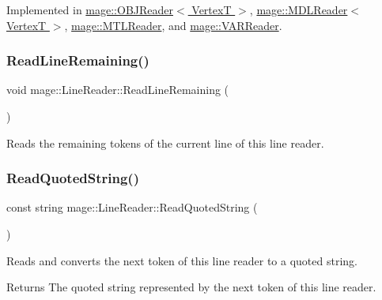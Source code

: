 Implemented in \hyperlink{classmage_1_1_o_b_j_reader_a8d4bd7be6de3098ba899cc36e3be1283}{mage\+::\+O\+B\+J\+Reader$<$ Vertex\+T $>$}, \hyperlink{classmage_1_1_m_d_l_reader_ac50f9cce64621b0a218b6778a611a702}{mage\+::\+M\+D\+L\+Reader$<$ Vertex\+T $>$}, \hyperlink{classmage_1_1_m_t_l_reader_ac3981549364be195f96b32cfafc8b147}{mage\+::\+M\+T\+L\+Reader}, and \hyperlink{classmage_1_1_v_a_r_reader_ae6c88d1a081c8e127f1e1258a3c2660d}{mage\+::\+V\+A\+R\+Reader}.

\hypertarget{classmage_1_1_line_reader_a3a4b99bfef1e8a826d74a01bcc663fcb}{}\label{classmage_1_1_line_reader_a3a4b99bfef1e8a826d74a01bcc663fcb} 
\subsubsection{\texorpdfstring{Read\+Line\+Remaining()}{ReadLineRemaining()}}
{\footnotesize\ttfamily void mage\+::\+Line\+Reader\+::\+Read\+Line\+Remaining (\begin{DoxyParamCaption}{ }\end{DoxyParamCaption})\hspace{0.3cm}{\ttfamily [protected]}}

Reads the remaining tokens of the current line of this line reader. \hypertarget{classmage_1_1_line_reader_ae9a7547d01b29c3237b198444d4f3aef}{}\label{classmage_1_1_line_reader_ae9a7547d01b29c3237b198444d4f3aef} 
\subsubsection{\texorpdfstring{Read\+Quoted\+String()}{ReadQuotedString()}}
{\footnotesize\ttfamily const string mage\+::\+Line\+Reader\+::\+Read\+Quoted\+String (\begin{DoxyParamCaption}{ }\end{DoxyParamCaption})\hspace{0.3cm}{\ttfamily [protected]}}

Reads and converts the next token of this line reader to a quoted string.

\begin{DoxyReturn}{Returns}
The quoted string represented by the next token of this line reader. 
\end{DoxyReturn}

